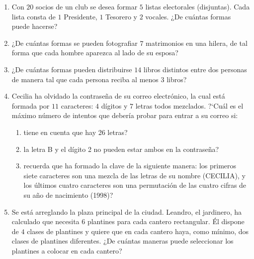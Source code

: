 \documentclass[a4paper,12pt,twoside,spanish,reqno]{amsbook}
\numberwithin{equation}{section}
\begin{document}
\begin{enumerate}[resume]

\item Con $20$ socios de un club se desea formar $5$ listas electorales (disjuntas).
Cada lista consta de $1$ Presidente, $1$ Tesorero y $2$ vocales.  ¿De cuántas
formas puede hacerse?


\item ¿De cuántas formas se pueden fotografiar $7$ matrimonios en una hilera,
de tal forma que cada hombre aparezca al lado de su esposa?


\item ¿De cuántas formas pueden distribuirse $14$ libros distintos entre dos
personas de manera tal que cada persona reciba al menos $3$ libros?

\item Cecilia ha olvidado la contraseña de su correo electrónico, la cual est\'a formada por $11$ caracteres: $4$ d\'igitos y $7$ letras todos mezclados. ?`Cu\'al es el m\'aximo n\'umero de intentos que deber\'ia probar para entrar a su correo si:
\begin{enumerate}
    \item  tiene en cuenta que hay 26 letras?
    
    \item la letra B y el d\'igito 2 no pueden estar ambos en la contraseña?
    
    \item  recuerda que ha formado la clave de la siguiente manera: los primeros siete caracteres son una mezcla de las letras de su nombre (CECILIA), y los \'ultimos cuatro caracteres son una permutaci\'on de las cuatro cifras de su a\~no de nacimiento (1998)?
\end{enumerate}

\item Se está arreglando la plaza principal de la ciudad. Leandro, el jardinero, ha calculado que
necesita $6$ plantines para cada cantero rectangular. Él dispone de $4$ clases de plantines y quiere
que en cada cantero haya, como mínimo, dos clases de plantines diferentes. ¿De cuántas maneras puede seleccionar los plantines a colocar en cada cantero? 

\end{enumerate}
\end{document}
